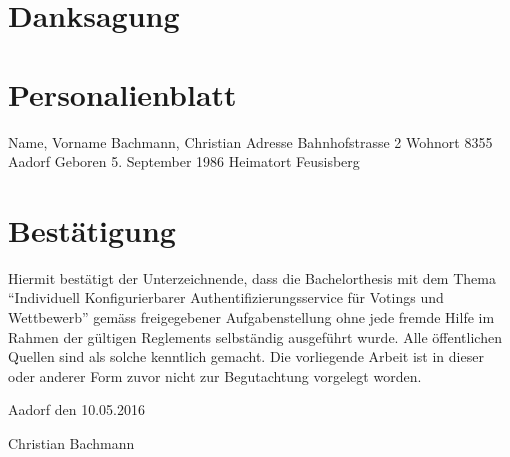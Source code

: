 \begingroup \let\clearpage\relax
\listoftables
\endgroup

\newpage

\chapter{Danksagung}\label{danksagung}

\newpage

\chapter{Personalienblatt}\label{personalienblatt}

Name, Vorname Bachmann, Christian Adresse Bahnhofstrasse 2 Wohnort 8355
Aadorf Geboren 5. September 1986 Heimatort Feusisberg

\newpage

\chapter{Bestätigung}\label{bestuxe4tigung}

Hiermit bestätigt der Unterzeichnende, dass die Bachelorthesis mit dem
Thema ``Individuell Konfigurierbarer Authentifizierungsservice für
Votings und Wettbewerb'' gemäss freigegebener Aufgabenstellung ohne jede
fremde Hilfe im Rahmen der gültigen Reglements selbständig ausgeführt
wurde. Alle öffentlichen Quellen sind als solche kenntlich gemacht. Die
vorliegende Arbeit ist in dieser oder anderer Form zuvor nicht zur
Begutachtung vorgelegt worden.

Aadorf den 10.05.2016

Christian Bachmann





